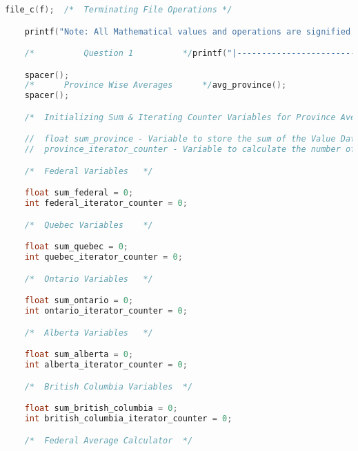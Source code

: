 \begin{lstlisting}[language=C, caption=\textit{CPS 188 Term Project Source Code}]
    file_c(f);  /*  Terminating File Operations */

	printf("Note: All Mathematical values and operations are signified and represented as follows in accordance to the percent operater parameter. Please refer to Project documentation for further information.\n");

    /*          Question 1          */printf("|------------------------------------------------------------------------------------------Question 1------------------------------------------------------------------------------------------|\n");

	spacer();
	/*		Province Wise Averages		*/avg_province();
	spacer();

    /*  Initializing Sum & Iterating Counter Variables for Province Averages Calculation	*/

    //  float sum_province - Variable to store the sum of the Value Data Points subsequently in every iteration
    //  province_iterator_counter - Variable to calculate the number of iterations performed in the for loop

    /*  Federal Variables   */

    float sum_federal = 0;
    int federal_iterator_counter = 0;

    /*  Quebec Variables    */

    float sum_quebec = 0;
    int quebec_iterator_counter = 0;

    /*  Ontario Variables   */

    float sum_ontario = 0;
    int ontario_iterator_counter = 0;

    /*  Alberta Variables   */

    float sum_alberta = 0;
    int alberta_iterator_counter = 0;

    /*  British Columbia Variables	*/

    float sum_british_columbia = 0;
    int british_columbia_iterator_counter = 0;

    /*  Federal Average Calculator  */


\end{lstlisting}
